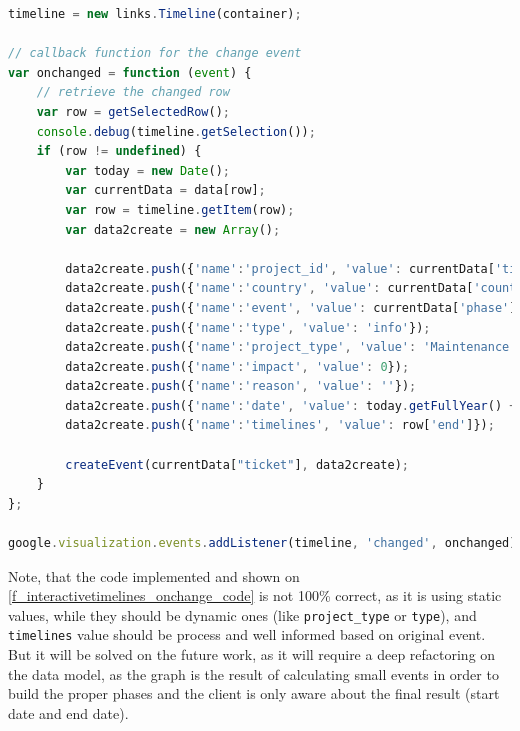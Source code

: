 \begin{lstlisting}[language=Javascript,breaklines=true,caption=CHAP On\
change\ event,label=f_interactivetimelines_onchange_code] 
timeline = new links.Timeline(container);
	
// callback function for the change event
var onchanged = function (event) {
    // retrieve the changed row
    var row = getSelectedRow();
    console.debug(timeline.getSelection());
    if (row != undefined) {
        var today = new Date();
        var currentData = data[row];
        var row = timeline.getItem(row);
        var data2create = new Array();
        
        data2create.push({'name':'project_id', 'value': currentData['ticket']});
        data2create.push({'name':'country', 'value': currentData['country']});
        data2create.push({'name':'event', 'value': currentData['phase']});
        data2create.push({'name':'type', 'value': 'info'});
        data2create.push({'name':'project_type', 'value': 'Maintenance'});
        data2create.push({'name':'impact', 'value': 0});
        data2create.push({'name':'reason', 'value': ''});
        data2create.push({'name':'date', 'value': today.getFullYear() +"-"+ today.getMonth()+1 +"-"+ today.getDate()});
        data2create.push({'name':'timelines', 'value': row['end']});
        
        createEvent(currentData["ticket"], data2create);
    }
};

google.visualization.events.addListener(timeline, 'changed', onchanged);
\end{lstlisting} 

Note, that the code implemented and shown on \ref{f_interactivetimelines_onchange_code} is not 100\% correct, as
it is using static values, while they should be dynamic ones (like \texttt{project\_type} or
\texttt{type}), and \texttt{timelines} value should be process and well informed
based on original event. But it will be solved on the future work, as it will
require a deep refactoring on the data model, as the graph is the result of
calculating small events in order to build the proper phases and the client is
only aware about the final result (start date and end date).


% 

